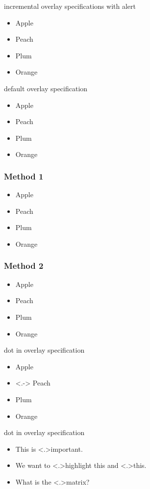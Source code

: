 \documentclass{beamer}
\begin{document}
\begin{frame}{incremental overlay specifications with alert}
\begin{itemize}
\item<+-| alert@+> Apple
\item<+-| alert@+> Peach
\item<+-| alert@+> Plum
\item<+-| alert@+> Orange
\end{itemize}
\end{frame}


\begin{frame}{default overlay specification}
\begin{itemize}[<+-| alert@+>]
\item Apple
\item Peach
\item Plum
\item Orange
\end{itemize}
\end{frame}


\begin{frame}
\frametitle{Method 1}
\begin{itemize}
\item<2-> Apple
\item<3-> Peach
\item<4-> Plum
\item<5-> Orange
\end{itemize}
\end{frame}

\begin{frame}
\frametitle{Method 2}
\begin{itemize}[<+(1)->]
\item Apple
\item Peach
\item Plum
\item Orange
\end{itemize}
\end{frame}


\begin{frame}{dot in overlay specification}
\begin{itemize}[<+->]
\item Apple
\item<.-> Peach
\item Plum
\item Orange
\end{itemize}
\end{frame}

\begin{frame}{dot in overlay specification}
\begin{itemize}[<+->]
\item This is \alert<.>{important}.
\item We want to \alert<.>{highlight} this and \alert<.>{this}.
\item What is the \alert<.>{matrix}?
\end{itemize}
\end{frame}
\end{document}

